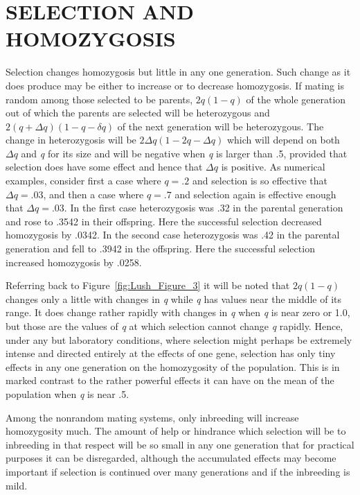 \section*{SELECTION AND HOMOZYGOSIS}
\label{sel_and_homozyg}

Selection changes homozygosis but little in any one generation. Such
change as it does produce may be either to increase or to decrease homozygosis.
If mating is random among those selected to be parents,
$2q(1 - q)$ of the whole generation out of which the parents are selected
will be heterozygous and $2(q + \Delta q)(1 - q - \delta q)$ of the next generation
will be heterozygous. The change in heterozygosis will be
$2 \Delta q (1 - 2q - \Delta q)$ which will depend on both $\Delta q$ and \textit{q} for its size
and will be negative when \textit{q} is larger than .5, provided that selection
does have some effect and hence that $\Delta q$ is positive. As numerical examples,
consider first a case where $q = .2$ and selection is so effective that
$\Delta q = .03$, and then a case where $q = .7$ and selection again is effective
enough that $\Delta q = .03$. In the first case heterozygosis was .32 in the parental
generation and rose to .3542 in their offspring. Here the successful
selection decreased homozygosis by .0342. In the second case heterozygosis
was .42 in the parental generation and fell to .3942 in the offspring.
Here the successful selection increased homozygosis by .0258.

Referring back to Figure~\ref{fig:Lush_Figure_3} it will be noted that
$2q (1 - q)$ changes only a little with changes in \textit{q} while \textit{q}
has values near the middle of its range. It does change rather rapidly with
changes in \textit{q} when \textit{q} is near zero or 1.0, but those are the values
of \textit{q} at which selection cannot change \textit{q} rapidly. Hence, under any
but laboratory conditions, where selection might perhaps be extremely intense and
directed entirely at the effects of one gene, selection has only tiny effects in any
one generation on the homozygosity of the population. This is in marked contrast to
the rather powerful effects it can have on the mean of the population when \textit{q}
is near .5.

Among the nonrandom mating systems, only inbreeding will
increase homozygosity much. The amount of help or hindrance which
selection will be to inbreeding in that respect will be so small in any one
generation that for practical purposes it can be disregarded, although
the accumulated effects may become important if selection is continued
over many generations and if the inbreeding is mild.

